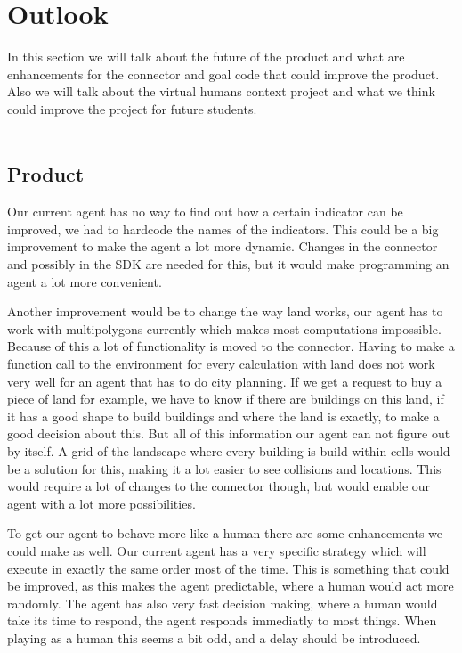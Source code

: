 \chapter{Outlook}
In this section we will talk about the future of the product and what are enhancements for the connector and goal code that could improve the product. Also we will talk about the virtual humans context project and what we think could improve the project for future students.
\\
\\
\section {Product}
Our current agent has no way to find out how a certain indicator can be improved, we had to hardcode the names of the indicators. This could be a big improvement to make the agent a lot more dynamic. Changes in the connector and possibly in the SDK are needed for this, but it would make programming an agent a lot more convenient.

Another improvement would be to change the way land works, our agent has to work with multipolygons currently which makes most computations impossible. Because of this a lot of functionality is moved to the connector. Having to make a function call to the environment for every calculation with land does not work very well for an agent that has to do city planning. If we get a request to buy a piece of land for example, we have to know if there are buildings on this land, if it has a good shape to build buildings and where the land is exactly, to make a good decision about this. But all of this information our agent can not figure out by itself. A grid of the landscape where every building is build within cells would be a solution for this, making it a lot easier to see collisions and locations. This would require a lot of changes to the connector though, but would enable our agent with a lot more possibilities.

To get our agent to behave more like a human there are some enhancements we could make as well. Our current agent has a very specific strategy which will execute in exactly the same order most of the time. This is something that could be improved, as this makes the agent predictable, where a human would act more randomly. The agent has also very fast decision making, where a human would take its time to respond, the agent responds immediatly to most things. When playing as a human this seems a bit odd, and a delay should be introduced.
\\
\\
